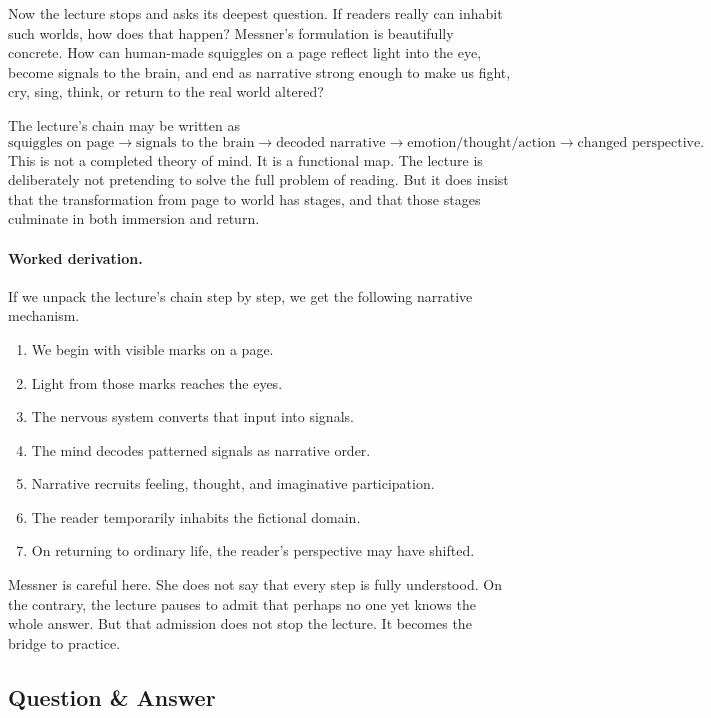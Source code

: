 Now the lecture stops and asks its deepest question. If readers really can inhabit such worlds, how does that happen? Messner's formulation is beautifully concrete. How can human-made squiggles on a page reflect light into the eye, become signals to the brain, and end as narrative strong enough to make us fight, cry, sing, think, or return to the real world altered?

The lecture's chain may be written as
\begin{equation}
\text{squiggles on page} \to \text{signals to the brain} \to \text{decoded narrative} \to \text{emotion/thought/action} \to \text{changed perspective}.
\end{equation}
This is not a completed theory of mind. It is a functional map. The lecture is deliberately not pretending to solve the full problem of reading. But it does insist that the transformation from page to world has stages, and that those stages culminate in both immersion and return.

\paragraph{Worked derivation.} If we unpack the lecture's chain step by step, we get the following narrative mechanism.
\begin{enumerate}
\item We begin with visible marks on a page.
\item Light from those marks reaches the eyes.
\item The nervous system converts that input into signals.
\item The mind decodes patterned signals as narrative order.
\item Narrative recruits feeling, thought, and imaginative participation.
\item The reader temporarily inhabits the fictional domain.
\item On returning to ordinary life, the reader's perspective may have shifted.
\end{enumerate}
Messner is careful here. She does not say that every step is fully understood. On the contrary, the lecture pauses to admit that perhaps no one yet knows the whole answer. But that admission does not stop the lecture. It becomes the bridge to practice.

\subsection{Question \& Answer}

